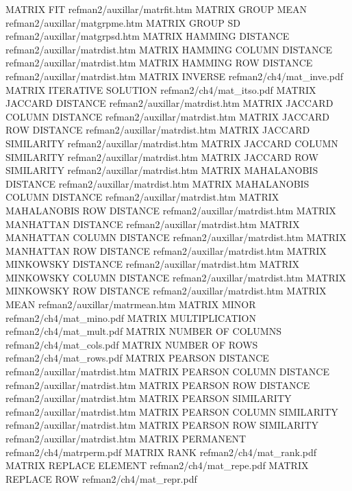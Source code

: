 MATRIX FIT                              refman2/auxillar/matrfit.htm
MATRIX GROUP MEAN                       refman2/auxillar/matgrpme.htm
MATRIX GROUP SD                         refman2/auxillar/matgrpsd.htm
MATRIX HAMMING DISTANCE                 refman2/auxillar/matrdist.htm
MATRIX HAMMING COLUMN DISTANCE          refman2/auxillar/matrdist.htm
MATRIX HAMMING ROW DISTANCE             refman2/auxillar/matrdist.htm
MATRIX INVERSE                          refman2/ch4/mat_inve.pdf
MATRIX ITERATIVE SOLUTION               refman2/ch4/mat_itso.pdf
MATRIX JACCARD DISTANCE                 refman2/auxillar/matrdist.htm
MATRIX JACCARD COLUMN DISTANCE          refman2/auxillar/matrdist.htm
MATRIX JACCARD ROW DISTANCE             refman2/auxillar/matrdist.htm
MATRIX JACCARD SIMILARITY               refman2/auxillar/matrdist.htm
MATRIX JACCARD COLUMN SIMILARITY        refman2/auxillar/matrdist.htm
MATRIX JACCARD ROW SIMILARITY           refman2/auxillar/matrdist.htm
MATRIX MAHALANOBIS DISTANCE             refman2/auxillar/matrdist.htm
MATRIX MAHALANOBIS COLUMN DISTANCE      refman2/auxillar/matrdist.htm
MATRIX MAHALANOBIS ROW DISTANCE         refman2/auxillar/matrdist.htm
MATRIX MANHATTAN DISTANCE               refman2/auxillar/matrdist.htm
MATRIX MANHATTAN COLUMN DISTANCE        refman2/auxillar/matrdist.htm
MATRIX MANHATTAN ROW DISTANCE           refman2/auxillar/matrdist.htm
MATRIX MINKOWSKY DISTANCE               refman2/auxillar/matrdist.htm
MATRIX MINKOWSKY COLUMN DISTANCE        refman2/auxillar/matrdist.htm
MATRIX MINKOWSKY ROW DISTANCE           refman2/auxillar/matrdist.htm
MATRIX MEAN                             refman2/auxillar/matrmean.htm
MATRIX MINOR                            refman2/ch4/mat_mino.pdf
MATRIX MULTIPLICATION                   refman2/ch4/mat_mult.pdf
MATRIX NUMBER OF COLUMNS                refman2/ch4/mat_cols.pdf
MATRIX NUMBER OF ROWS                   refman2/ch4/mat_rows.pdf
MATRIX PEARSON DISTANCE                 refman2/auxillar/matrdist.htm
MATRIX PEARSON COLUMN DISTANCE          refman2/auxillar/matrdist.htm
MATRIX PEARSON ROW DISTANCE             refman2/auxillar/matrdist.htm
MATRIX PEARSON SIMILARITY               refman2/auxillar/matrdist.htm
MATRIX PEARSON COLUMN SIMILARITY        refman2/auxillar/matrdist.htm
MATRIX PEARSON ROW SIMILARITY           refman2/auxillar/matrdist.htm
MATRIX PERMANENT                        refman2/ch4/matrperm.pdf
MATRIX RANK                             refman2/ch4/mat_rank.pdf
MATRIX REPLACE ELEMENT                  refman2/ch4/mat_repe.pdf
MATRIX REPLACE ROW                      refman2/ch4/mat_repr.pdf
